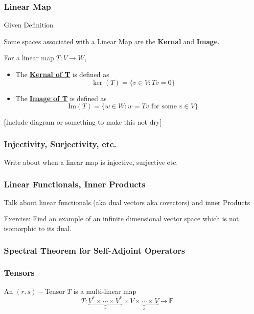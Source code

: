 \documentclass{article}
\begin{document}
\vskip 1cm
\subsubsection{Linear Map}
Given Definition

\vskip 1cm
Some spaces associated with a Linear Map are the \textbf{Kernal} and \textbf{Image}. 

\begin{dottedbox}
  For a linear map $T : V \rightarrow W$, 
  \begin{itemize}
    \item The \underline{\textbf{Kernal of T}} is defined as 
    \[ \ker(T) = \{ v \in V : Tv = 0 \}  \]

    \item The \underline{\textbf{Image of T}} is defined as 
    \[ \text{Im}(T) = \{ w \in W : w = Tv \text{ for some } v \in V \} \]
  \end{itemize}
\end{dottedbox}

[Include diagram or something to make this not dry]

\subsubsection{Injectivity, Surjectivity, etc.}
Write about when a linear map is injective, surjective etc.

\subsubsection{Linear Functionals, Inner Products}
Talk about linear functionals (aka dual vectors aka covectors) and inner Products

\underline{Exercise:} Find an example of an infinite dimensional vector space which is not isomorphic to its dual.

\vskip 1cm
\subsubsection{Spectral Theorem for Self-Adjoint Operators}

\vskip 1cm
\subsubsection{Tensors}
An $(r, s)-$Tensor $T$ is a multi-linear map 
\[ T : \underbrace{V^{*} \times \cdots \times V^{*}}_{r} \times \underbrace{V \times \cdots \times V}_s \rightarrow \mathbb{F} \]
\end{document}
